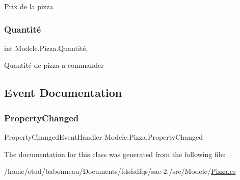 Prix de la pizza 

\mbox{\label{classModele_1_1Pizza_ae755ca79feb6f9a522aa18544c3f1310}} 
\subsubsection{\texorpdfstring{Quantité}{Quantité}}
{\footnotesize\ttfamily int Modele.\+Pizza.\+Quantité\hspace{0.3cm}{\ttfamily [get]}, {\ttfamily [set]}}



Quantité de pizza a commander 



\subsection{Event Documentation}
\mbox{\label{classModele_1_1Pizza_a21d2ca36726c18044b92e1286f6f938f}} 
\subsubsection{\texorpdfstring{Property\+Changed}{PropertyChanged}}
{\footnotesize\ttfamily Property\+Changed\+Event\+Handler Modele.\+Pizza.\+Property\+Changed}



The documentation for this class was generated from the following file\+:\begin{DoxyCompactItemize}
\item 
/home/etud/babonneau/\+Documents/fdsfsdfqs/sae-\/2./src/\+Modele/\hyperlink{Pizza_8cs}{Pizza.\+cs}\end{DoxyCompactItemize}
